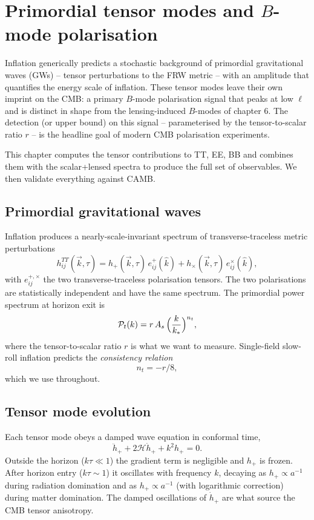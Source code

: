 \section{Primordial tensor modes and $B$-mode polarisation}
\label{ch:tensors}

Inflation generically predicts a stochastic background of primordial gravitational waves (GWs) -- tensor perturbations to the FRW metric -- with an amplitude that quantifies the energy scale of inflation. These tensor modes leave their own imprint on the CMB: a primary $B$-mode polarisation signal that peaks at low $\ell$ and is distinct in shape from the lensing-induced $B$-modes of chapter 6. The detection (or upper bound) on this signal -- parameterised by the tensor-to-scalar ratio $r$ -- is the headline goal of modern CMB polarisation experiments.

This chapter computes the tensor contributions to TT, EE, BB and combines them with the scalar+lensed spectra to produce the full set of observables. We then validate everything against CAMB.

\subsection{Primordial gravitational waves}

Inflation produces a nearly-scale-invariant spectrum of transverse-traceless metric perturbations
\[
  h_{ij}^{TT}(\vec k, \tau) = h_+(\vec k, \tau)\, e^+_{ij}(\hat k) + h_\times(\vec k, \tau)\, e^\times_{ij}(\hat k),
\]
with $e^{+,\times}_{ij}$ the two transverse-traceless polarisation tensors. The two polarisations are statistically independent and have the same spectrum. The primordial power spectrum at horizon exit is
\begin{equation}
  \mathcal{P}_t(k) = r\, A_s\,\Bigl(\frac{k}{k_*}\Bigr)^{n_t},
  \label{eq:Pt}
\end{equation}
where the tensor-to-scalar ratio $r$ is what we want to measure. Single-field slow-roll inflation predicts the \emph{consistency relation}
\[
  n_t = -r/8,
\]
which we use throughout.

\subsection{Tensor mode evolution}

Each tensor mode obeys a damped wave equation in conformal time,
\begin{equation}
  \ddot h_+ + 2\mathcal{H}\dot h_+ + k^2 h_+ = 0.
  \label{eq:hT_wave}
\end{equation}
Outside the horizon ($k\tau \ll 1$) the gradient term is negligible and $h_+$ is frozen. After horizon entry ($k\tau \sim 1$) it oscillates with frequency $k$, decaying as $h_+ \propto a^{-1}$ during radiation domination and as $h_+ \propto a^{-1}$ (with logarithmic correction) during matter domination. The damped oscillations of $\dot h_+$ are what source the CMB tensor anisotropy.


